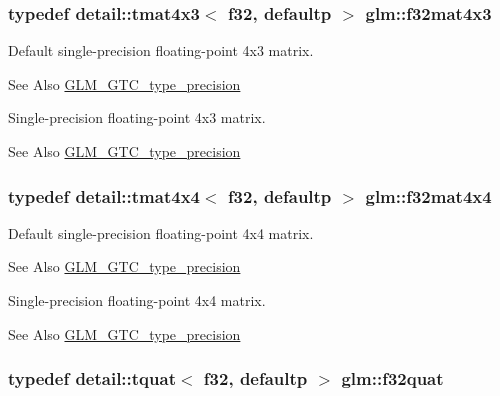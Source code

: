 \hypertarget{group__gtc__type__precision_ga5102ae88531e072efe57e75354e10347}{
\subsubsection[{f32mat4x3}]{\setlength{\rightskip}{0pt plus 5cm}typedef detail\-::tmat4x3$<$ f32, defaultp $>$ {\bf glm\-::f32mat4x3}}}\label{group__gtc__type__precision_ga5102ae88531e072efe57e75354e10347}
Default single-\/precision floating-\/point 4x3 matrix. \begin{DoxySeeAlso}{See Also}
\hyperlink{group__gtc__type__precision}{G\-L\-M\-\_\-\-G\-T\-C\-\_\-type\-\_\-precision}
\end{DoxySeeAlso}
Single-\/precision floating-\/point 4x3 matrix. \begin{DoxySeeAlso}{See Also}
\hyperlink{group__gtc__type__precision}{G\-L\-M\-\_\-\-G\-T\-C\-\_\-type\-\_\-precision} 
\end{DoxySeeAlso}
\hypertarget{group__gtc__type__precision_ga939fc7fbeb62575aca543d3a0342d807}{
\subsubsection[{f32mat4x4}]{\setlength{\rightskip}{0pt plus 5cm}typedef detail\-::tmat4x4$<$ f32, defaultp $>$ {\bf glm\-::f32mat4x4}}}\label{group__gtc__type__precision_ga939fc7fbeb62575aca543d3a0342d807}
Default single-\/precision floating-\/point 4x4 matrix. \begin{DoxySeeAlso}{See Also}
\hyperlink{group__gtc__type__precision}{G\-L\-M\-\_\-\-G\-T\-C\-\_\-type\-\_\-precision}
\end{DoxySeeAlso}
Single-\/precision floating-\/point 4x4 matrix. \begin{DoxySeeAlso}{See Also}
\hyperlink{group__gtc__type__precision}{G\-L\-M\-\_\-\-G\-T\-C\-\_\-type\-\_\-precision} 
\end{DoxySeeAlso}
\hypertarget{group__gtc__type__precision_gafc69e0f1b9ac1a001bb4b1b9710d4f92}{
\subsubsection[{f32quat}]{\setlength{\rightskip}{0pt plus 5cm}typedef detail\-::tquat$<$ f32, defaultp $>$ {\bf glm\-::f32quat}}}\label{group__gtc__type__precision_gafc69e0f1b9ac1a001bb4b1b9710d4f92}
